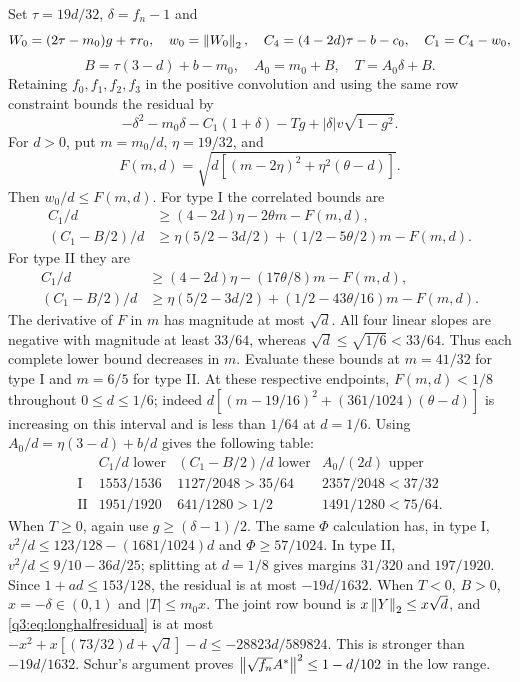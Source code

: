 Set $\tau=19d/32$, $\delta=f_n-1$ and
\[
 W_0=(2\tau-m_0)g+\tau {r_0},\quad w_0=\left\lVert W_0\right\rVert_2,\quad
 C_4=(4-2d)\tau-b-c_0,\quad C_1=C_4-w_0,
\]
\[
 B=\tau(3-d)+b-m_0,\quad A_0=m_0+B,\quad T=A_0\delta+B.
\]
Retaining $f_0,f_1,f_2,f_3$ in the positive convolution and using the same row constraint bounds the residual by
\begin{equation}\label{q3:eq:longhalfresidual}
 -\delta^2-m_0\delta-C_1(1+\delta)-Tg+
 |\delta|v\sqrt{1-g^2}.
\end{equation}
For $d>0$, put $m=m_0/d$, $\eta=19/32$, and
\[
 F(m,d)=\sqrt{d[(m-2\eta)^2+\eta^2(\theta-d)]}.
\]
Then $w_0/d\le F(m,d)$. For type I the correlated bounds are
\[
 \begin{split}
 C_1/d&\ge(4-2d)\eta-2\theta m-F(m,d),\\
 (C_1-B/2)/d&\ge\eta(5/2-3d/2)
                  +(1/2-5\theta/2)m-F(m,d).
 \end{split}
\]
For type II they are
\[
 \begin{split}
 C_1/d&\ge(4-2d)\eta-(17\theta/8)m-F(m,d),\\
 (C_1-B/2)/d&\ge\eta(5/2-3d/2)
                  +(1/2-43\theta/16)m-F(m,d).
 \end{split}
\]
The derivative of $F$ in $m$ has magnitude at most $\sqrt d$.
All four linear slopes are negative with magnitude at least $33/64$,
whereas $\sqrt d\le\sqrt{1/6}<33/64$. Thus each complete lower
bound decreases in $m$. Evaluate these bounds at $m=41/32$ for
type I and $m=6/5$ for type II. At these respective endpoints,
$F(m,d)<1/8$ throughout $0\le d\le1/6$; indeed
$d[(m-19/16)^2+(361/1024)(\theta-d)]$ is increasing on this
interval and is less than $1/64$ at $d=1/6$.
Using $A_0/d=\eta(3-d)+b/d$ gives the following table: 
\[
\begin{array}{c|c|c|c}
&C_1/d\text{ lower}&(C_1-B/2)/d\text{ lower}&A_0/(2d)\text{ upper}\\\hline
\mathrm I&1553/1536&1127/2048>35/64&2357/2048<37/32\\
\mathrm {II}&1951/1920&641/1280>1/2&1491/1280<75/64 .
\end{array}
\]
When $T\ge0$, again use $g\ge(\delta-1)/2$. The same $\Phi$ calculation has, in type I, $v^2/d\le123/128-(1681/1024)d$ and $\Phi\ge57/1024$. In type II, $v^2/d\le9/10-36d/25$; splitting at $d=1/8$ gives margins $31/320$ and $197/1920$. Since $1+ad\le153/128$, the residual is at most $-19d/1632$. When $T<0$, $B>0$, $x=-\delta\in(0,1)$ and $|T|\le m_0x$. The joint row bound is $x\left\lVert Y\right\rVert_2\le x\sqrt d$, and \eqref{q3:eq:longhalfresidual} is at most
$-x^2+x[(73/32)d+\sqrt d]-d\le-28823d/589824$.
This is stronger than $-19d/1632$. Schur's argument proves
$\left\lVert\sqrt{f_n}A^*\right\rVert^2\le1-d/102$ in the low range.

